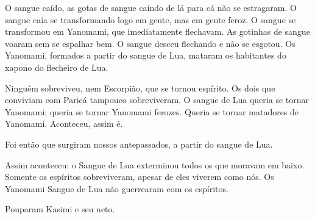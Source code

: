 O sangue caído, as gotas de sangue caindo de lá para cá não se
estragaram. O sangue caía se transformando logo em gente, mas em
gente feroz. O sangue se transformou em Yanomami, que imediatamente
flechavam. As gotinhas de sangue voaram sem se espalhar bem. O sangue
desceu flechando e não se esgotou. Os Yanomami, formados a partir
do sangue de Lua, mataram os habitantes do xapono do flecheiro de Lua. 

Ninguém sobreviveu, nem Escorpião, que se tornou espírito. Os dois que
conviviam com Paricá tampouco sobreviveram. O sangue de Lua queria se
tornar Yanomami; queria se tornar Yanomami ferozes. Queria se tornar
matadores de Yanomami. Aconteceu, assim é. 

Foi então que surgiram nossos antepassados, a partir do sangue de Lua. 

Assim aconteceu: o Sangue de Lua exterminou todos os que moravam em
baixo. Somente os espíritos sobreviveram, apesar de eles viverem como
nós. Os Yanomami Sangue de Lua não guerrearam com os espíritos.

Pouparam Kasimi e seu neto. 